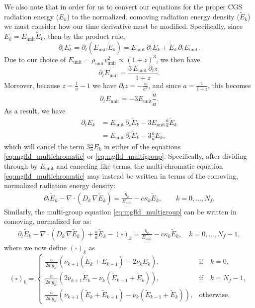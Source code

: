 \documentclass[10pt]{article}
\renewcommand{\(}{\left(}
\renewcommand{\)}{\right)}
\newcommand{\adot}{\dot{a}}
\newcommand{\Dunit}{\rho_{\text{unit}}}
\newcommand{\Vunit}{v_{\text{unit}}}
\newcommand{\Eunit}{E_{\text{unit}}}
\newcommand{\tE}{\tilde{E}}
\begin{document}
We also note that in order for us to convert our equations
for the proper CGS radiation energy ($E_k$) to the normalized,
comoving radiation energy density ($\tE_k$) we must consider how our
time derivative must be modified.  Specifically, since $E_k = \Eunit
\tE_k$, then by the product rule,
\[
   \partial_t E_k = \partial_t \left(\Eunit \tE_k\right) = 
   \Eunit\, \partial_t \tE_k + \tE_k\, \partial_t \Eunit.
\]
Due to our choice of $\Eunit = \Dunit \Vunit^2 \propto (1+z)^3$, we then have 
\[
   \partial_t \Eunit = \frac{3\, \Eunit\, \partial_t z}{1+z}.
\]
Moreover, because $z = \frac{1}{a}-1$ we have $\partial_t z =
-\frac{\adot}{a^2}$, and since $a = \frac{1}{1+z}$, this becomes 
\[
   \partial_t \Eunit = -3\Eunit\frac{\adot}{a}.
\]
As a result, we have 
\begin{align*}
   \partial_t E_k &= \Eunit\, \partial_t \tE_k - 3\Eunit \frac{\adot}{a} \tE_k \\
   &= \Eunit\, \partial_t \tE_k - 3\frac{\adot}{a} E_k,
\end{align*}
which will cancel the term $3 \frac{\adot}{a} E_k$ in either of the
equations \eqref{eq:mgfld_multichromatic} or
\eqref{eq:mgfld_multigroup}.  Specifically, after dividing through by 
$\Eunit$ and canceling like terms, the multi-chromatic equation
\eqref{eq:mgfld_multichromatic} may instead be written in terms of the
comoving, normalized radiation energy density: 
\begin{align}
  \label{eq:mgfld_multichromatic_Ecomoving}
  \partial_{t} \tE_k - \nabla\cdot(D_k\,\nabla \tE_k) 
    = \frac{\eta_k}{\Eunit} - c \kappa_k \tE_k, \qquad k=0,\ldots,N_f.
\end{align}
Similarly, the multi-group equation \eqref{eq:mgfld_multigroup} can be
written in comoving, normalized for as:
\begin{align}
  \label{eq:mgfld_multigroup_Ecomoving}
  \partial_{t} \tE_k - \nabla\cdot(D_k\,\nabla \tE_k) +
    \frac{\adot}{a}\tE_k - (\square)_k = \frac{\eta_k}{\Eunit} - c
    \kappa_k \tE_k, \quad k=0,\ldots,N_f-1,
\end{align}
where we now define $(\square)_k$ as 
\[
  (\square)_k = \begin{cases}
    \frac{\adot}{2a|g_k|}\left(
      \nu_{k+1} (\tE_k+\tE_{k+1}) - 2\nu_k \tE_k\right),&
      \text{if}\quad k=0,\\
    \frac{\adot}{2a|g_k|}\left(
      2\nu_{k+1} \tE_k - \nu_k (\tE_{k-1}+\tE_k)\right),&
      \text{if}\quad k=N_f-1,\\
    \frac{\adot}{2a|g_k|}\left(
      \nu_{k+1} (\tE_k+\tE_{k+1}) - \nu_{k}(\tE_{k-1}+\tE_{k})\right),& 
      \text{otherwise}.
  \end{cases}
\]
\end{document}
